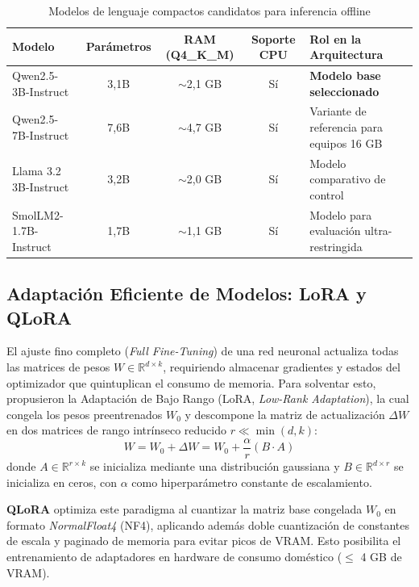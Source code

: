 \begin{table}[H]
\centering
\caption{Modelos de lenguaje compactos candidatos para inferencia offline}
\label{tab:modelos}
\small
\begin{tabularx}{\textwidth}{@{}p{4.2cm}cccX@{}}
\toprule
\textbf{Modelo} & \textbf{Parámetros} & \textbf{RAM (Q4\_K\_M)} & \textbf{Soporte CPU} & \textbf{Rol en la Arquitectura} \\
\midrule
Qwen2.5-3B-Instruct   & 3,1B & $\sim$2,1 GB & Sí & \textbf{Modelo base seleccionado} \\
Qwen2.5-7B-Instruct   & 7,6B & $\sim$4,7 GB & Sí & Variante de referencia para equipos 16 GB \\
Llama 3.2 3B-Instruct & 3,2B & $\sim$2,0 GB & Sí & Modelo comparativo de control \\
SmolLM2-1.7B-Instruct & 1,7B & $\sim$1,1 GB & Sí & Modelo para evaluación ultra-restringida \\
\bottomrule
\end{tabularx}
\end{table}

\subsection{Adaptación Eficiente de Modelos: LoRA y QLoRA}
El ajuste fino completo (\textit{Full Fine-Tuning}) de una red neuronal actualiza todas las matrices de pesos $W \in \mathbb{R}^{d \times k}$, requiriendo almacenar gradientes y estados del optimizador que quintuplican el consumo de memoria. Para solventar esto, \citet{Hu2021} propusieron la Adaptación de Bajo Rango (LoRA, \textit{Low-Rank Adaptation}), la cual congela los pesos preentrenados $W_0$ y descompone la matriz de actualización $\Delta W$ en dos matrices de rango intrínseco reducido $r \ll \min(d, k)$:
$$W = W_0 + \Delta W = W_0 + \frac{\alpha}{r} (B \cdot A)$$
donde $A \in \mathbb{R}^{r \times k}$ se inicializa mediante una distribución gaussiana y $B \in \mathbb{R}^{d \times r}$ se inicializa en ceros, con $\alpha$ como hiperparámetro constante de escalamiento.

\textbf{QLoRA} \citep{Dettmers2023} optimiza este paradigma al cuantizar la matriz base congelada $W_0$ en formato \textit{NormalFloat4} (NF4), aplicando además doble cuantización de constantes de escala y paginado de memoria para evitar picos de VRAM. Esto posibilita el entrenamiento de adaptadores en hardware de consumo doméstico ($\le$ 4 GB de VRAM).

